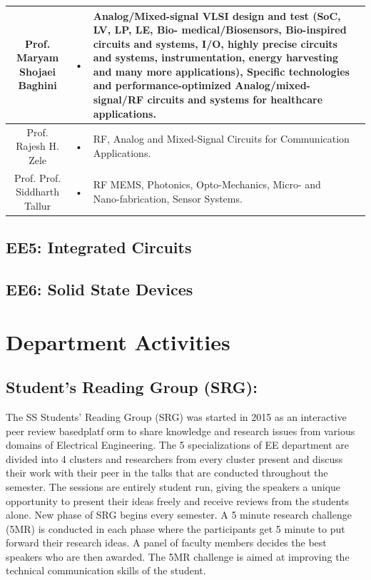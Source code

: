 \documentclass[11pt,fleqn,openany]{book} %
\begin{document}
\begin{tabular}{|c|c|p{6cm}|c}
 \hline 
  Prof. Maryam Shojaei Baghini & • & Analog/Mixed-signal VLSI design and test (SoC, LV, LP, LE, Bio-
medical/Biosensors, Bio-inspired circuits and systems, I/O, highly precise circuits and systems, instrumentation, energy harvesting and many more applications), Specific technologies and performance-optimized Analog/mixed-signal/RF circuits and systems for healthcare applications.\\ 
\hline 
 Prof. Rajesh H. Zele & • & RF, Analog and Mixed-Signal Circuits for Communication Applications. \\ 
\hline 
 Prof. Prof. Siddharth Tallur & • &  RF MEMS, Photonics, Opto-Mechanics, Micro- and Nano-fabrication, Sensor Systems.\\ 
\hline 
\end{tabular} 
\section{EE5: Integrated Circuits}
\section{EE6: Solid State Devices} 
\chapter{Department Activities}
\section {Student's Reading Group (SRG):}
The SS Students’ Reading Group (SRG) was started in 2015 as an interactive peer review basedplatf orm to share knowledge and research issues from various domains of Electrical Engineering. The 5 specializations of EE department are divided into 4 clusters and researchers from every cluster present and discuss their work with their peer in the talks that are conducted throughout the semester. The sessions are entirely student run, giving the speakers a unique opportunity to present their ideas freely and receive reviews from the students alone.\newline
New phase of SRG begins every semester. A 5 minute research challenge (5MR) is conducted in each phase where the participants get 5 minute to put forward their research ideas. A panel of faculty members decides the best speakers who are then awarded. The 5MR challenge is aimed
at improving the technical communication skills of the student.
\end{document}
